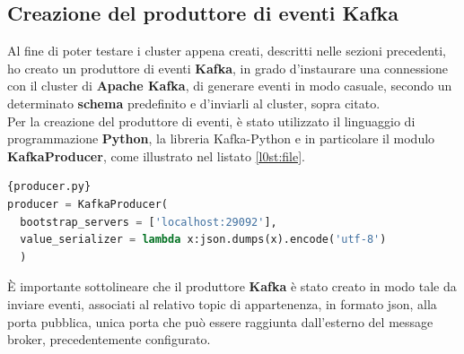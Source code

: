 \subsection{Creazione del produttore di eventi Kafka}
Al fine di poter testare i \gls{cluster}{} appena creati, descritti nelle sezioni precedenti, ho creato 
un produttore di eventi \textbf{Kafka}, 
in grado d'instaurare una connessione con il \gls{cluster}{} di \textbf{Apache Kafka}, di 
generare eventi in modo casuale, secondo un determinato \textbf{schema} predefinito e d'inviarli al \gls{cluster}{}, sopra citato.
\\Per la creazione del produttore di eventi, è stato utilizzato il linguaggio di programmazione \textbf{Python}, la libreria \gls{Kafka-Python}{} e in particolare il modulo \textbf{KafkaProducer}, come illustrato nel listato \ref{l0st:file}.
\begin{lstlisting}[language=Python, caption=\texttt{producer.py}, label=l0st:file]{producer.py}
producer = KafkaProducer(  
  bootstrap_servers = ['localhost:29092'],  
  value_serializer = lambda x:json.dumps(x).encode('utf-8')  
  )  
\end{lstlisting}
È importante sottolineare che il produttore \textbf{Kafka} è stato creato in modo tale da inviare  eventi, associati al relativo \gls{topic}{} di appartenenza, in formato \gls{json}{},
alla porta pubblica, unica porta che può essere raggiunta dall'esterno
del \gls{message broker}{}, precedentemente configurato.
\pagebreak
